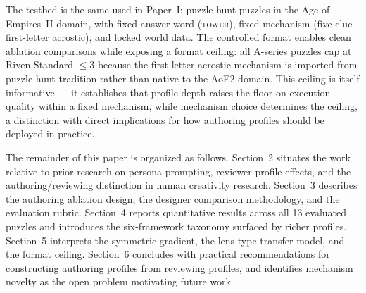 The testbed is the same used in Paper~I: puzzle hunt puzzles in the Age of Empires~II domain, with fixed answer word (\textsc{tower}), fixed mechanism (five-clue first-letter acrostic), and locked world data. The controlled format enables clean ablation comparisons while exposing a format ceiling: all A-series puzzles cap at Riven Standard $\leq 3$ because the first-letter acrostic mechanism is imported from puzzle hunt tradition rather than native to the AoE2 domain. This ceiling is itself informative — it establishes that profile depth raises the floor on execution quality within a fixed mechanism, while mechanism choice determines the ceiling, a distinction with direct implications for how authoring profiles should be deployed in practice.

The remainder of this paper is organized as follows. Section~2 situates the work relative to prior research on persona prompting, reviewer profile effects, and the authoring/reviewing distinction in human creativity research. Section~3 describes the authoring ablation design, the designer comparison methodology, and the evaluation rubric. Section~4 reports quantitative results across all 13 evaluated puzzles and introduces the six-framework taxonomy surfaced by richer profiles. Section~5 interprets the symmetric gradient, the lens-type transfer model, and the format ceiling. Section~6 concludes with practical recommendations for constructing authoring profiles from reviewing profiles, and identifies mechanism novelty as the open problem motivating future work.
